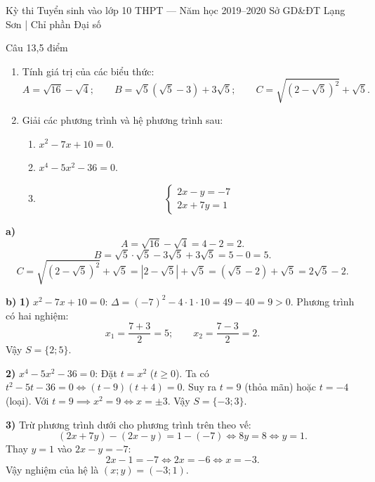 ﻿%
%
  {Kỳ thi Tuyển sinh vào lớp 10 THPT — Năm học 2019--2020}%
  {Sở GD\&ĐT Lạng Sơn | Chỉ phần Đại số}

\begin{de_cau}{Câu 1}{3,5 điểm}
\begin{enumerate}[label=\alph*)]
\item Tính giá trị của các biểu thức:
\[A = \sqrt{16} - \sqrt{4};\qquad B = \sqrt{5}(\sqrt{5}-3) + 3\sqrt{5};\qquad C = \sqrt{(2-\sqrt{5})^2} + \sqrt{5}.\]
\item Giải các phương trình và hệ phương trình sau:
\begin{enumerate}[label=\arabic*)]
\item $x^2 - 7x + 10 = 0$.
\item $x^4 - 5x^2 - 36 = 0$.
\item 
\[ \begin{cases} 2x - y = -7 \\ 2x + 7y = 1 \end{cases} \]
\end{enumerate}
\end{enumerate}
\end{de_cau}

\begin{loi_giai_cau}
\textbf{a)}
\[A = \sqrt{16} - \sqrt{4} = 4 - 2 = \boxed{2}.\]
\[B = \sqrt{5}\cdot\sqrt{5} - 3\sqrt{5} + 3\sqrt{5} = 5 - 0 = \boxed{5}.\]
\[C = \sqrt{(2-\sqrt{5})^2} + \sqrt{5} = |2-\sqrt{5}| + \sqrt{5} = (\sqrt{5}-2) + \sqrt{5} = \boxed{2\sqrt{5}-2}.\]

\textbf{b)}
\textbf{1)} $x^2 - 7x + 10 = 0$:
$\Delta = (-7)^2 - 4 \cdot 1 \cdot 10 = 49 - 40 = 9 > 0$.
Phương trình có hai nghiệm:
\[x_1 = \frac{7 + 3}{2} = 5;\qquad x_2 = \frac{7 - 3}{2} = 2.\]
Vậy $\boxed{S = \{2; 5\}}$.

\textbf{2)} $x^4 - 5x^2 - 36 = 0$:
Đặt $t = x^2$ ($t \ge 0$). Ta có $t^2 - 5t - 36 = 0 \iff (t-9)(t+4) = 0$.
Suy ra $t = 9$ (thỏa mãn) hoặc $t = -4$ (loại).
Với $t = 9 \implies x^2 = 9 \iff x = \pm 3$.
Vậy $\boxed{S = \{-3; 3\}}$.

\textbf{3)} Trừ phương trình dưới cho phương trình trên theo vế:
\[(2x + 7y) - (2x - y) = 1 - (-7) \iff 8y = 8 \iff y = 1.\]
Thay $y = 1$ vào $2x - y = -7$:
\[2x - 1 = -7 \iff 2x = -6 \iff x = -3.\]
Vậy nghiệm của hệ là $\boxed{(x; y) = (-3; 1)}$.
\end{loi_giai_cau}

